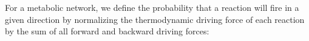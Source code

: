 For a metabolic network, we define the probability that a reaction  will fire in a given direction by normalizing the thermodynamic driving force of each reaction by the sum of all forward and backward driving forces:
